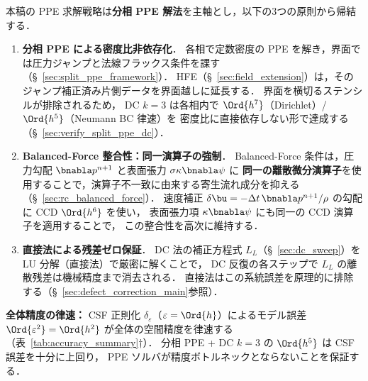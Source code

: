 \begin{tcolorbox}[mybox, title={設計選択の根拠：分相 PPE + DC + CCD 勾配の統合設計}]
\label{box:ppe_design_rationale}
本稿の PPE 求解戦略は\textbf{分相 PPE 解法}を主軸とし，以下の3つの原則から帰結する．

\begin{enumerate}
  \item \textbf{分相 PPE による密度比非依存化}．
        各相で定数密度の PPE を解き，界面では圧力ジャンプと法線フラックス条件を課す
        （§~\ref{sec:split_ppe_framework}）．
        HFE（§~\ref{sec:field_extension}）は，そのジャンプ補正済み片側データを界面越しに延長する．
        界面を横切るステンシルが排除されるため，
        DC $k{=}3$ は各相内で $\Ord{h^7}$（Dirichlet）/ $\Ord{h^5}$（Neumann BC 律速）を
        密度比に直接依存しない形で達成する
        （§~\ref{sec:verify_split_ppe_dc}）．

  \item \textbf{Balanced-Force 整合性：同一演算子の強制}．
        Balanced-Force 条件は，圧力勾配 $\bnabla p^{n+1}$ と表面張力 $\sigma\kappa\bnabla\psi$ に
        \textbf{同一の離散微分演算子}を使用することで，演算子不一致に由来する寄生流れ成分を抑える
        （§~\ref{sec:rc_balanced_force}）．
        速度補正 $\delta\bu = -\Delta t\,\bnabla p^{n+1}/\rho$ の勾配に CCD $\Ord{h^6}$ を使い，
        表面張力項 $\kappa\bnabla\psi$ にも同一の CCD 演算子を適用することで，
        この整合性を高次に維持する．

  \item \textbf{直接法による残差ゼロ保証}．
        DC 法の補正方程式 $L_L$（§~\ref{sec:dc_sweep}）を LU 分解（直接法）で厳密に解くことで，
        DC 反復の各ステップで $L_L$ の離散残差は機械精度まで消去される．
        直接法はこの系統誤差を原理的に排除する（§~\ref{sec:defect_correction_main}参照）．
\end{enumerate}

\noindent\textbf{全体精度の律速：}
CSF 正則化 $\delta_\varepsilon$（$\varepsilon=\Ord{h}$）によるモデル誤差
$\Ord{\varepsilon^2}=\Ord{h^2}$ が全体の空間精度を律速する（表~\ref{tab:accuracy_summary}†）．
分相 PPE + DC $k{=}3$ の $\Ord{h^5}$ は CSF 誤差を十分に上回り，
PPE ソルバが精度ボトルネックとならないことを保証する．
\end{tcolorbox}
